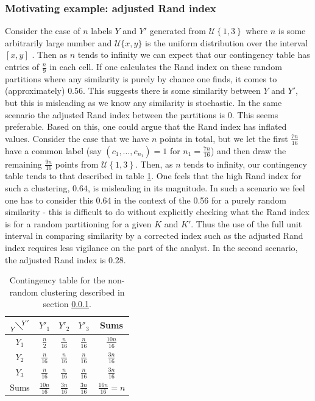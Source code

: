 \documentclass[12pt]{article} %
\begin{document}
\subsubsection{Motivating example: adjusted Rand index} \label{sec:motivating_example_adjusted_rand_index}
Consider the case of $n$ labels $Y$ and $Y'$ generated from $\mathcal{U}\left\{1,3\right\}$ where $n$ is some arbitrarily large number and $\mathcal{U}\{x,y\}$ is the uniform distribution over the interval $[x,y]$ . Then as $n$ tends to infinity we can expect that our contingency table has entries of $\frac{n}{9}$ in each cell. If one calculates the Rand index on these random partitions where any similarity is purely by chance one finds, it comes to (approximately) $0.56$. This suggests there is some similarity between $Y$ and $Y'$, but this is misleading as we know any similarity is stochastic. In the same scenario the adjusted Rand index between the partitions is 0. This seems preferable. Based on this, one could argue that the Rand index has inflated values. Consider the case that we have $n$ points in total, but we let the first $\frac{7n}{16}$ have a common label (say $\left(c_1,\ldots,c_{n_1}\right)=1$ for $n_1 = \frac{7n}{16}$) and then draw the remaining $\frac{9n}{16}$ points from $\mathcal{U}\left\{1,3\right\}$. Then, as $n$ tends to infinity, our contingency table tends to that described in table \ref{table:rand_contingency_example}. One feels that the high Rand index for such a clustering, $0.64$, is misleading in its magnitude. In such a scenario we feel one has to consider this 0.64 in the context of the 0.56 for a purely random similarity - this is difficult to do without explicitly checking what the Rand index is for a random partitioning for a given $K$ and $K'$. Thus the use of the full unit interval in comparing similarity by a corrected index such as the adjusted Rand index requires less vigilance on the part of the analyst. In the second scenario, the adjusted Rand index is $0.28$.

\begin{table}[] 
	\centering
	\begin{tabular}{c|ccc|c} 
		$ {{} \atop Y}  \!\diagdown\! ^{Y'}$	& $Y'_1$	& $Y'_2$	& $Y'_3 $	& Sums	\\ 
		\hline
		$Y_1$		& $\frac{n}{2}$	& $\frac{n}{16}$ & $\frac{n}{16}$	& $\frac{10n}{16}$	\\
		$Y_2$		& $\frac{n}{16}$	& $\frac{n}{16}$	& $\frac{n}{16}$	& $\frac{3n}{16}$	\\
		$Y_3$	& $\frac{n}{16}$	& $\frac{n}{16}$	& $\frac{n}{16}$	& $\frac{3n}{16}$	\\ 
		\hline
		Sums	& $\frac{10n}{16}$	&  $\frac{3n}{16}$	& $\frac{3n}{16}$	& $\frac{16n}{16} = n$         
	\end{tabular}
	\caption{Contingency table for the non-random clustering described in section \ref{sec:motivating_example_adjusted_rand_index}.}
	\label{table:rand_contingency_example}
\end{table}
\end{document}
